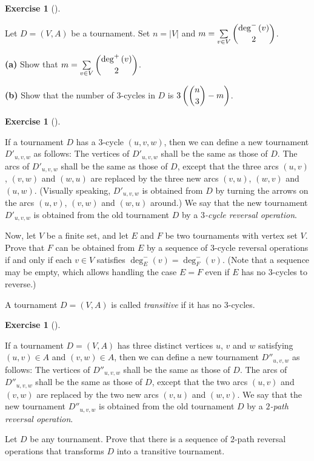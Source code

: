 \documentclass[numbers=enddot,12pt,final,onecolumn,notitlepage]{scrartcl}%
\newcounter{exer}
\theoremstyle{definition}
\newtheorem{exmp}[exer]{Exercise}
\newenvironment{exercise}[1][]
{\begin{exmp}[#1]\begin{leftbar}}
{\end{leftbar}\end{exmp}}
\let\sumnonlimits\sum
\renewcommand{\sum}{\sumnonlimits\limits}
\newcommand{\abs}[1]{\left| #1 \right|}
\newcommand{\tup}[1]{\left( #1 \right)}
\begin{document}
\begin{exercise}
Let $D = \tup{V, A}$ be a tournament.
Set $n = \abs{V}$ and $m = \sum_{v \in V} \dbinom{\deg^-\tup{v}}{2}$.

\textbf{(a)} Show that $m = \sum_{v \in V} \dbinom{\deg^+\tup{v}}{2}$.

\textbf{(b)} Show that the number of $3$-cycles in $D$ is
$3\tup{\dbinom{n}{3} - m}$.
\end{exercise}

\begin{exercise}
If a tournament $D$ has a $3$-cycle $\tup{u, v, w}$, then
we can define a new tournament $D'_{u, v, w}$ as follows: The vertices
of $D'_{u, v, w}$ shall be the same as those of $D$. The arcs of
$D'_{u, v, w}$ shall be the same as those of $D$, except that the
three arcs $\tup{u, v}$, $\tup{v, w}$ and $\tup{w, u}$ are replaced
by the three new arcs $\tup{v, u}$, $\tup{w, v}$ and $\tup{u, w}$.
(Visually speaking, $D'_{u, v, w}$ is obtained from $D$ by turning the
arrows on the arcs $\tup{u, v}$, $\tup{v, w}$ and $\tup{w, u}$
around.) We say that the new tournament $D'_{u, v, w}$ is obtained
from the old tournament $D$ by a \textit{$3$-cycle reversal operation}.

Now, let $V$ be a finite set, and let $E$ and $F$ be two tournaments
with vertex set $V$. Prove that $F$ can be obtained from $E$ by a
sequence of $3$-cycle reversal operations if and only if each
$v \in V$ satisfies $\deg^-_E \tup{v} = \deg^-_F \tup{v}$.
(Note that a sequence may be empty, which allows handling the case
$E = F$ even if $E$ has no $3$-cycles to reverse.)
\end{exercise}

A tournament $D = \tup{V, A}$ is called \textit{transitive} if it
has no $3$-cycles.

\begin{exercise}
If a tournament $D = \tup{V, A}$ has three distinct vertices
$u$, $v$ and $w$ satisfying $\tup{u, v} \in A$ and $\tup{v, w} \in A$,
then we can define a new tournament $D''_{u, v, w}$ as follows:
The vertices of $D''_{u, v, w}$ shall be the same as those of $D$. The
arcs of $D''_{u, v, w}$ shall be the same as those of $D$, except that
the two arcs $\tup{u, v}$ and $\tup{v, w}$ are replaced
by the two new arcs $\tup{v, u}$ and $\tup{w, v}$.
We say that the new tournament $D''_{u, v, w}$ is obtained
from the old tournament $D$ by a \textit{$2$-path reversal operation}.

Let $D$ be any tournament. Prove that there is a sequence of
$2$-path reversal operations that transforms $D$ into a transitive
tournament.
\end{exercise}
\end{document}
